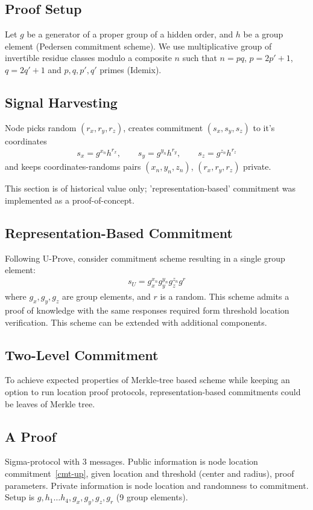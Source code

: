 \documentclass{article}
\begin{document}
\subsection{Proof Setup}

Let $g$ be a generator of a proper group of a hidden order,
and $h$ be a group element (Pedersen commitment scheme).
We use multiplicative group of invertible residue classes modulo a composite $n$ such that
$n=pq$, $p=2p'+1$, $q=2q'+1$ and $p, q, p', q'$ primes (Idemix).
\cite{Idemix}

\subsection{Signal Harvesting}
Node picks random $(r_x, r_y, r_z)$, creates commitment $(s_x, s_y, s_z)$ to it's coordinates
\begin{gather}
\label{cmt-pedr}
s_x = g^{x_n} h^{r_x},   \qquad
s_y = g^{y_n} h^{r_y},   \qquad
s_z = g^{z_n} h^{r_z}
\end{gather}
and keeps coordinates-randoms pairs
$(x_n, y_n, z_n)$, $(r_x, r_y, r_z)$
private.

This section is of historical value only;
'representation-based' commitment was implemented as a proof-of-concept.

\subsection{Representation-Based Commitment}
Following U-Prove, consider commitment scheme resulting in a single group element:
\begin{gather}
\label{cmt-up}
s_U = g_x^{x_n} g_y^{y_n} g_z^{z_n} g^{r}
\end{gather}
where $g_x, g_y, g_z$ are group elements, and $r$ is a random.
This scheme admits a proof of knowledge with the same responses required form threshold location verification.
This scheme can be extended with additional components. %

\subsection{Two-Level Commitment}
To achieve expected properties of Merkle-tree based scheme while keeping an option
to run location proof protocols,
representation-based commitments could be leaves of Merkle tree.

\subsection{A Proof}
\label{sect-close}
Sigma-protocol with 3 messages.
Public information is node location commitment~\eqref{cmt-up}, given location and threshold (center and radius), proof parameters.
Private information is node location and randomness to commitment.
Setup is $g, h_1 \dots h_4, g_x, g_y, g_z, g_r$
(9 group elements).
\end{document}
